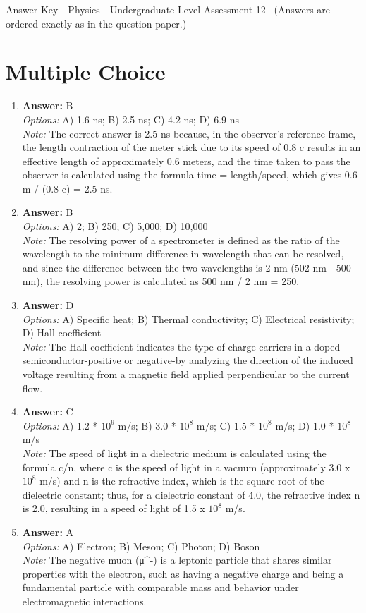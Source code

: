 \documentclass[12pt]{article}
\begin{document}
\begin{center}
Answer Key - Physics - Undergraduate Level Assessment 12 \
\small (Answers are ordered exactly as in the question paper.)
\end{center}

\section*{Multiple Choice}
\begin{enumerate}[label=\arabic*.]
\item \textbf{Answer:} B
\\ \textit{Options:} A) 1.6 ns; B) 2.5 ns; C) 4.2 ns; D) 6.9 ns
\\ \textit{Note:} The correct answer is 2.5 ns because, in the observer's reference frame, the length contraction of the meter stick due to its speed of 0.8 c results in an effective length of approximately 0.6 meters, and the time taken to pass the observer is calculated using the formula time = length/speed, which gives 0.6 m / (0.8 c) = 2.5 ns.
\item \textbf{Answer:} B
\\ \textit{Options:} A) 2; B) 250; C) 5,000; D) 10,000
\\ \textit{Note:} The resolving power of a spectrometer is defined as the ratio of the wavelength to the minimum difference in wavelength that can be resolved, and since the difference between the two wavelengths is 2 nm (502 nm - 500 nm), the resolving power is calculated as 500 nm / 2 nm = 250.
\item \textbf{Answer:} D
\\ \textit{Options:} A) Specific heat; B) Thermal conductivity; C) Electrical resistivity; D) Hall coefficient
\\ \textit{Note:} The Hall coefficient indicates the type of charge carriers in a doped semiconductor-positive or negative-by analyzing the direction of the induced voltage resulting from a magnetic field applied perpendicular to the current flow.
\item \textbf{Answer:} C
\\ \textit{Options:} A) 1.2 * $10^9$ m/s; B) 3.0 * $10^8$ m/s; C) 1.5 * $10^8$ m/s; D) 1.0 * $10^8$ m/s
\\ \textit{Note:} The speed of light in a dielectric medium is calculated using the formula c/n, where c is the speed of light in a vacuum (approximately 3.0 x $10^8$ m/s) and n is the refractive index, which is the square root of the dielectric constant; thus, for a dielectric constant of 4.0, the refractive index n is 2.0, resulting in a speed of light of 1.5 x $10^8$ m/s.
\item \textbf{Answer:} A
\\ \textit{Options:} A) Electron; B) Meson; C) Photon; D) Boson
\\ \textit{Note:} The negative muon (μ^-) is a leptonic particle that shares similar properties with the electron, such as having a negative charge and being a fundamental particle with comparable mass and behavior under electromagnetic interactions.
\end{enumerate}
\end{document}
